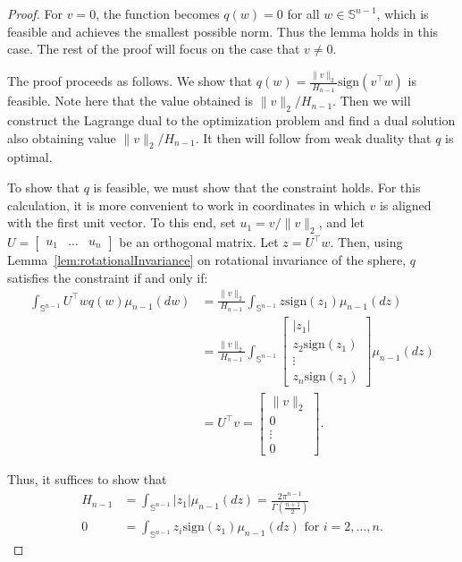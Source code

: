 \documentclass[10pt,a4paper]{amsart}
\newcommand{\sign}{\mathrm{sign}}
\renewcommand{\S}{\mathbb{S}}
\begin{document}
\begin{proof}
For $v=0$, the function becomes $q(w)=0$ for all $w\in \S^{n-1}$, which is feasible and achieves the smallest possible norm. Thus the lemma holds in this case. The rest of the proof will focus on the case that $v\ne 0$.

The proof proceeds as follows. We show that $q(w)=\frac{\|v\|_2}{H_{n-1}}\sign(v^\top w)$ is feasible. Note  here that the value obtained is $\|v\|_2/H_{n-1}.$ Then we will construct the Lagrange dual to the optimization problem and find a dual solution also obtaining value $\|v\|_2/H_{n-1}.$ It then will follow from weak duality that $q$ is optimal. 

To show that $q$ is feasible, we must show that the constraint holds. For this calculation, it is more convenient to work in coordinates in which $v$ is aligned with the first unit vector. To this end, set $u_1=v/\|v\|_2$, and let $U=\begin{bmatrix}u_1 & \ldots & u_n\end{bmatrix}$ be an orthogonal matrix. Let $z=U^\top w$. Then, using Lemma~\ref{lem:rotationalInvariance} on rotational invariance of the sphere, $q$ satisfies the constraint if and only if:
\begin{align*}
\int_{\S^{n-1}}U^\top w q(w)\mu_{n-1}(dw)&=
\frac{\|v\|_2}{H_{n-1}}\int_{\S^{n-1}}z\sign(z_1)\mu_{n-1}(dz)\\
&=\frac{\|v\|_2}{H_{n-1}}\int_{\S^{n-1}}
\begin{bmatrix}
|z_1|\\
z_2 \sign(z_1) \\
\vdots \\
z_n\sign(z_1)
\end{bmatrix}
\mu_{n-1}(dz) \\
&=U^\top v = \begin{bmatrix}
\|v\|_2 \\
0 \\
\vdots \\
0
\end{bmatrix}.
\end{align*}

Thus, it suffices to show that 
\begin{align}
\label{eq:coordinateIntegral}
H_{n-1}&=\int_{\S^{n-1}}|z_1|\mu_{n-1}(dz) = \frac{2\pi^{n-1}}{\Gamma\left(\frac{n+1
}{2}\right)} \\
\label{eq:signOrthogonal}
0&=\int_{\S^{n-1}}z_i\sign(z_1)\mu_{n-1}(dz) \textrm{ for } i=2,\ldots,n.
\end{align}


\end{proof}
\end{document}
